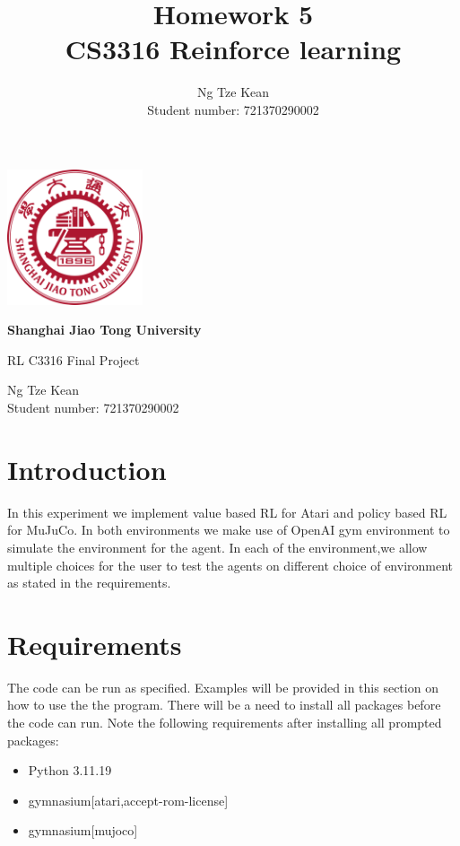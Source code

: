 \documentclass{article}
\title{Homework 5\\CS3316 Reinforce learning}
\author{Ng Tze Kean\\Student number: 721370290002}
\begin{document}
\begin{titlepage}
    \begin{center}
        \vfill

        \includegraphics[width=4cm]{sjtu.png}

        \vspace{1cm}

        \textbf{\huge Shanghai Jiao Tong University}

        \vspace{0.5cm}

        {\large RL C3316 Final Project}

        \vspace{1.5cm}

        Ng Tze Kean\\Student number: 721370290002

    \end{center}
\end{titlepage}

\section*{Introduction}

In this experiment we implement value based RL for Atari and policy based RL
for MuJuCo. In both environments we make use of OpenAI gym environment to
simulate the environment for the agent. In each of the environment,we allow
multiple choices for the user to test the agents on different choice of
environment as stated in the requirements.

\section*{Requirements}

The code can be run as specified. Examples will be provided in this section on
how to use the the program. There will be a need to install all packages before
the code can run. Note the following requirements after installing all prompted
packages:

\begin{itemize}
    \item Python 3.11.19
    \item gymnasium[atari,accept-rom-license]
    \item gymnasium[mujoco]
\end{itemize}
\end{document}
